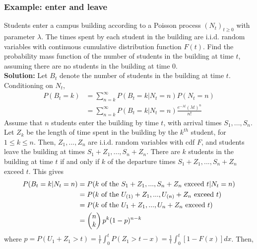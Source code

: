 \documentclass[11pt,a4paper]{article}
\begin{document}
\subsubsection*{Example: enter and leave}
Students enter a campus building according to a Poisson process $(N_t)_{t\geq 0}$ with parameter $\lambda$. The times spent by each student in the building are i.i.d. random variables with continuous cumulative distribution function $F(t)$. Find the probability mass function of the number of students in the building at time $t$, assuming there are no students in the building at time $0$.\\
\textbf{Solution:} Let $B_t$ denote the number of students in the building at time $t$. Conditioning on $N_t$,
\begin{equation}
    \begin{aligned}
        P(B_t=k)&=\sum_{n=k}^\infty P(B_t=k|N_t=n)P(N_t=n)\\
        &=\sum_{n=k}^\infty P(B_t=k|N_t=n)\frac{e^{-\lambda t}(\lambda t)^n}{n!}
    \end{aligned}
    \nonumber
\end{equation}
Assume that $n$ students enter the building by time $t$, with arrival times $S_1,...,S_n$. Let $Z_k$ be the length of time spent in the building by the $k^{th}$ student, for $1\leq k\leq n$. Then, $Z_1,...,Z_n$ are i.i.d. random variables with cdf $F$, and students leave the building at times $S_1+Z_1,...,S_n+Z_n$. There are $k$ students in the building at time $t$ if and only if $k$ of the departure times $S_1+Z_1,...,S_n+Z_n$ exceed $t$. This gives
\begin{equation}
    \begin{aligned}
        P(B_t=k|N_t=n)&=P(k\textnormal{ of the }S_1+Z_1,...,S_n+Z_n\textnormal{ exceed }t|N_t=n)\\
        &=P(k\textnormal{ of the }U_{(1)}+Z_1,...,U_{(n)}+Z_n\textnormal{ exceed }t)\\
        &=P(k\textnormal{ of the }U_{1}+Z_1,...,U_{n}+Z_n\textnormal{ exceed }t)\\
        &=\begin{pmatrix}
            n\\
            k
        \end{pmatrix}p^k(1-p)^{n-k}
    \end{aligned}
    \nonumber
\end{equation}
where $p=P(U_1+Z_1>t)=\frac{1}{t}\int_{0}^tP(Z_1>t-x)=\frac{1}{t}\int_{0}^t[1-F(x)]dx$. Then,
\end{document}
